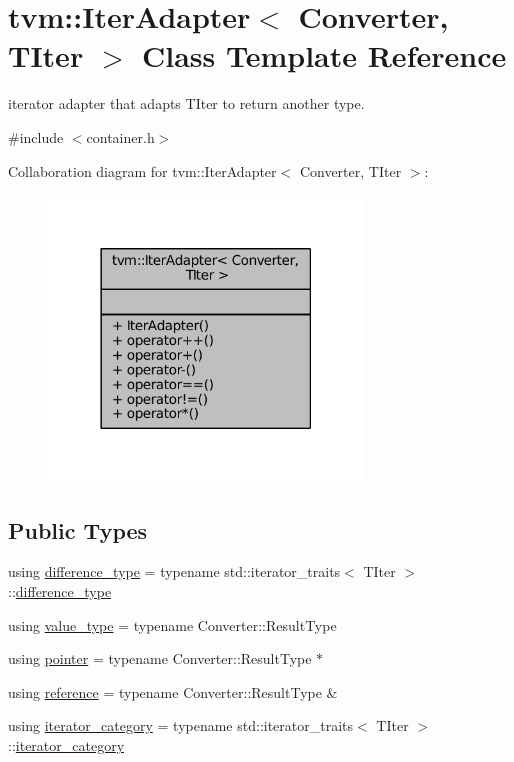 \hypertarget{classtvm_1_1IterAdapter}{}\section{tvm\+:\+:Iter\+Adapter$<$ Converter, T\+Iter $>$ Class Template Reference}
\label{classtvm_1_1IterAdapter}


iterator adapter that adapts T\+Iter to return another type.  




{\ttfamily \#include $<$container.\+h$>$}



Collaboration diagram for tvm\+:\+:Iter\+Adapter$<$ Converter, T\+Iter $>$\+:
\nopagebreak
\begin{figure}[H]
\begin{center}
\leavevmode
\includegraphics[width=237pt]{classtvm_1_1IterAdapter__coll__graph}
\end{center}
\end{figure}
\subsection*{Public Types}
\begin{DoxyCompactItemize}
\item 
using \hyperlink{classtvm_1_1IterAdapter_a6fcccf32d94242ce3b0613db5bcd53d5}{difference\+\_\+type} = typename std\+::iterator\+\_\+traits$<$ T\+Iter $>$\+::\hyperlink{classtvm_1_1IterAdapter_a6fcccf32d94242ce3b0613db5bcd53d5}{difference\+\_\+type}
\item 
using \hyperlink{classtvm_1_1IterAdapter_a920384d7073ed15812199181625d857e}{value\+\_\+type} = typename Converter\+::\+Result\+Type
\item 
using \hyperlink{classtvm_1_1IterAdapter_acdd89c4869bbb96d00fafd85ff3a3492}{pointer} = typename Converter\+::\+Result\+Type $\ast$
\item 
using \hyperlink{classtvm_1_1IterAdapter_a02187b2d7b029d2f27c4d999b84f958d}{reference} = typename Converter\+::\+Result\+Type \&
\item 
using \hyperlink{classtvm_1_1IterAdapter_a2fa322bdb58941c57c6f25ea53678ed7}{iterator\+\_\+category} = typename std\+::iterator\+\_\+traits$<$ T\+Iter $>$\+::\hyperlink{classtvm_1_1IterAdapter_a2fa322bdb58941c57c6f25ea53678ed7}{iterator\+\_\+category}
\end{DoxyCompactItemize}
